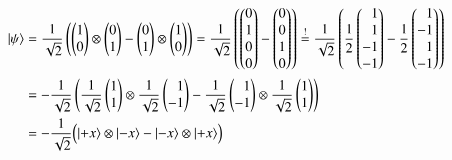 \begin{refsection}
\begin{align}
    |\psi\rangle &= \frac{1}{\sqrt{2}} 
    \left( 
        \begin{pmatrix} 1\\0 \end{pmatrix} 
        \otimes 
        \begin{pmatrix} 0\\1 \end{pmatrix}
        -
        \begin{pmatrix} 0\\1 \end{pmatrix}
        \otimes
        \begin{pmatrix} 1\\0 \end{pmatrix}
     \right)
     =
     \frac{1}{\sqrt{2}}\left(
         \begin{pmatrix} 0 \\ 1 \\ 0 \\ 0 \end{pmatrix}
         -
         \begin{pmatrix} 0 \\ 0 \\ 1 \\ 0 \end{pmatrix}
     \right)
     \stackrel{!}{=}
     \frac{1}{\sqrt{2}}\left(
         \frac{1}{2}
         \begin{pmatrix} \phantom{-}1 \\ \phantom{-}1 \\ -1 \\ -1 \end{pmatrix}
         -
         \frac{1}{2}
         \begin{pmatrix} \phantom{-}1 \\ -1 \\ \phantom{-}1 \\ -1 \end{pmatrix}
     \right)  \notag \\
     &=
    -\frac{1}{\sqrt{2}} \left( 
        \frac{1}{\sqrt{2}}\begin{pmatrix} 1 \\ 1 \end{pmatrix} 
        \otimes 
        \frac{1}{\sqrt{2}}\begin{pmatrix} \phantom{-}1 \\ -1 \end{pmatrix}
        -
        \frac{1}{\sqrt{2}}\begin{pmatrix} \phantom{-}1 \\ -1 \end{pmatrix}
        \otimes
        \frac{1}{\sqrt{2}}\begin{pmatrix} 1 \\ 1 \end{pmatrix} 
     \right) \notag  \\
      &= 
      -\frac{1}{\sqrt{2}} \Big( 
              |{+}x\rangle \otimes |{-}x\rangle - |{-}x\rangle \otimes |{+}x\rangle
           \Big)\label{equ:bell:psix}
\end{align}


\end{refsection}
